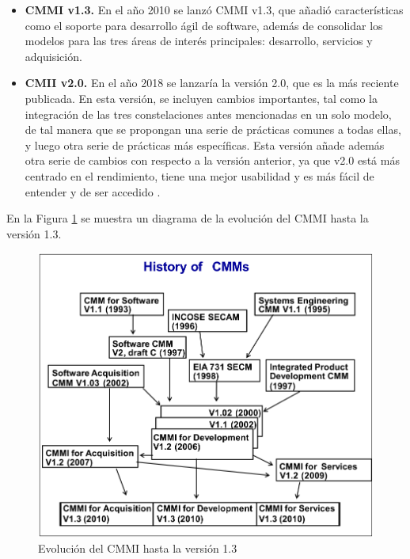 \begin{itemize}
    \item \textbf{CMMI v1.3.} En el año 2010 se lanzó CMMI v1.3, que añadió características como el soporte para desarrollo ágil de software, además de consolidar los modelos para las tres áreas de interés principales: desarrollo, servicios y adquisición. 
    
    \item \textbf{CMII v2.0.} En el año 2018 se lanzaría la versión 2.0, que es la más reciente publicada. En esta versión, se incluyen cambios importantes, tal como la integración de las tres constelaciones antes mencionadas en un solo modelo, de tal manera que se propongan una serie de prácticas comunes a todas ellas, y luego otra serie de prácticas más específicas. Esta versión añade además otra serie de cambios con respecto a la versión anterior, ya que v2.0 está más centrado en el rendimiento, tiene una mejor usabilidad y es más fácil de entender y de ser accedido \cite{history2}\cite{13vs20}.
\end{itemize}

En la Figura \ref{fig:evolution} se muestra un diagrama de la evolución del CMMI hasta la versión 1.3.

\begin{figure}[h]
    \centering
    \includegraphics[width=\textwidth]{Images/evolution.PNG}
    \caption{Evolución del CMMI hasta la versión 1.3}
    \label{fig:evolution}
\end{figure}
